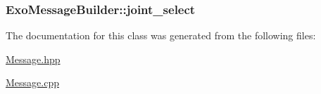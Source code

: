 \subsubsection[{\texorpdfstring{joint\+\_\+select}{joint_select}}]{ Exo\+Message\+Builder\+::joint\+\_\+select}\hypertarget{classExoMessageBuilder_aed2ae0c14e8bbb3019378558337d1b01}{}\label{classExoMessageBuilder_aed2ae0c14e8bbb3019378558337d1b01}


The documentation for this class was generated from the following files\+:\begin{DoxyCompactItemize}
\item 
\hyperlink{Message_8hpp}{Message.\+hpp}\item 
\hyperlink{Message_8cpp}{Message.\+cpp}\end{DoxyCompactItemize}
